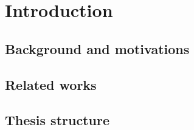 \chapter{Introduction}
\label{chap:intro}

% 
% 
% 
% 
% 

\section{Background and motivations}
\label{chap:intro-background}

\section{Related works}
\label{chap:intro-related-works}

\section{Thesis structure}
\label{chap:intro-structure} 

